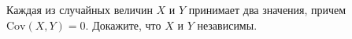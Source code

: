 \documentclass{article}
\begin{document}
Каждая из случайных величин $X$ и $Y$ принимает два значения,
причем $\mathrm{Cov} (X,Y) = 0$. Докажите, что $X$ и $Y$ независимы.
\end{document}
